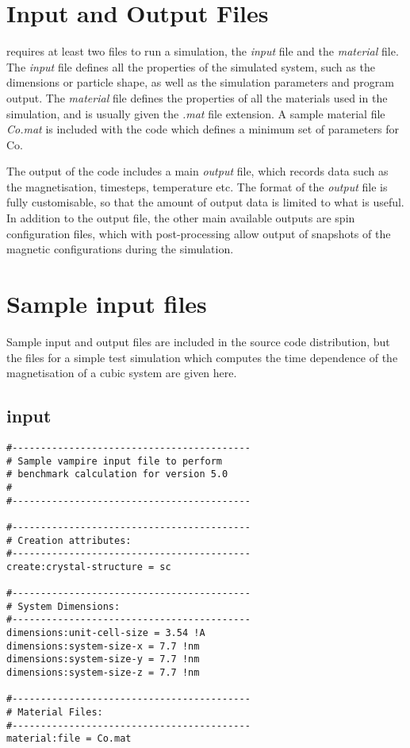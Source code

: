 \section*{Input and Output Files}
\vampire requires at least two files to run a simulation, the \textit{input} file and the \textit{material} file. The \textit{input} file defines all the properties of the simulated system, such as the dimensions or particle shape, as well as the simulation parameters and program output. The \textit{material} file defines the properties of all the materials used in the simulation, and is usually given the \textit{.mat} file extension. A sample material file \textit{Co.mat} is included with the code which defines a minimum set of parameters for Co. 

The output of the code includes a main \textit{output} file, which records data such as the magnetisation, timesteps, temperature etc. The format of the \textit{output} file is fully customisable, so that the amount of output data is limited to what is useful. In addition to the output file, the other main available outputs are spin configuration files, which with post-processing allow output of snapshots of the magnetic configurations during the simulation.

\section*{Sample input files}
Sample input and output files are included in the source code distribution, but the files for a simple test simulation which computes the time dependence of the magnetisation of a cubic system are given here.

\subsection*{input}
{\footnotesize
\begin{verbatim}
#------------------------------------------
# Sample vampire input file to perform
# benchmark calculation for version 5.0
#
#------------------------------------------

#------------------------------------------
# Creation attributes:
#------------------------------------------
create:crystal-structure = sc

#------------------------------------------
# System Dimensions:
#------------------------------------------
dimensions:unit-cell-size = 3.54 !A
dimensions:system-size-x = 7.7 !nm
dimensions:system-size-y = 7.7 !nm
dimensions:system-size-z = 7.7 !nm

#------------------------------------------
# Material Files:
#------------------------------------------
material:file = Co.mat
\end{verbatim}
}

